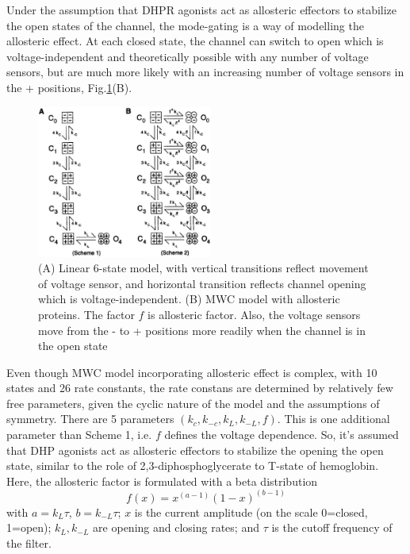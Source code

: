 Under the assumption that DHPR agonists act as allosteric effectors to stabilize
the open states of the channel, the mode-gating is a way of modelling the
allosteric effect. At each closed state, the channel can switch to open which is
voltage-independent and theoretically possible with any number of voltage
sensors, but are much more likely with an increasing number of voltage sensors
in the + positions, Fig.\ref{fig:DHPR_Marks1992}(B).

\begin{figure}[htb]
  \centerline{\includegraphics[height=5cm]{./images/DHPR_Marks1992.eps}}
  \caption{(A) Linear 6-state model, with vertical transitions reflect movement
  of voltage sensor, and horizontal transition reflects channel opening which is
  voltage-independent. (B) MWC model with allosteric proteins. The factor $f$ is
  allosteric factor. Also, the voltage sensors move from the - to + positions
  more readily when the channel is in the open state \citep{marks1992}}
  \label{fig:DHPR_Marks1992}
\end{figure}

Even though MWC model incorporating allosteric effect is complex, with 10 states
and 26 rate constants, the rate constans are determined by relatively few free
parameters, given the cyclic nature of the model and the assumptions of
symmetry. There are 5 parameters $(k_c, k_{-c}, k_L, k_{-L}, f)$. This is one
additional parameter than Scheme 1, i.e.  $f$ defines the voltage dependence.
So, it's assumed that DHP agonists act as allosteric effectors to stabilize the
opening the open state, similar to the role of 2,3-diphosphoglycerate to T-state
of hemoglobin. Here, the allosteric factor is formulated with a beta
distribution
\begin{equation}
f(x) = x^{(a-1)}(1-x)^{(b-1)}
\end{equation}
with $a=k_L\tau$, $b=k_{-L}\tau$; $x$ is the current amplitude (on the scale
0=closed, 1=open); $k_L, k_{-L}$ are opening and closing rates; and $\tau$ is
the cutoff frequency of the filter.

